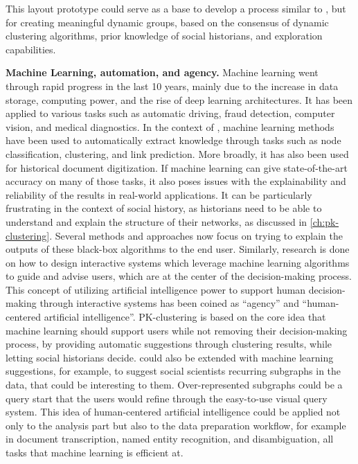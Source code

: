 This layout prototype could serve as a base to develop a process similar to \pkclustering, but for creating meaningful dynamic groups, based on the consensus of dynamic clustering algorithms, prior knowledge of social historians, and exploration capabilities.



\noindent\textbf{Machine Learning, automation, and agency.} Machine learning went through rapid progress in the last 10 years, mainly due to the increase in data storage, computing power, and the rise of deep learning architectures.
It has been applied to various tasks such as automatic driving, fraud detection, computer vision, and medical diagnostics.
In the context of \sna, machine learning methods have been used to automatically extract knowledge through tasks such as node classification, clustering, and link prediction\cite{michalskiPredictingSocialNetwork2012}.
More broadly, it has also been used for historical document digitization\cite{philipsHistoricalDocumentProcessing2020}.
If machine learning can give state-of-the-art accuracy on many of those tasks, it also poses issues with the explainability and reliability of the results in real-world applications.
It can be particularly frustrating in the context of social history, as historians need to be able to understand and explain the structure of their networks, as discussed in \autoref{ch:pk-clustering}.
Several methods and approaches now focus on trying to explain the outputs of these black-box algorithms to the end user\cite{holzingerMachineLearningExplainable2018}.
Similarly, research is done on how to design interactive systems which leverage machine learning algorithms to guide and advise users, which are at the center of the decision-making process.
This concept of utilizing artificial intelligence power to support human decision-making through interactive systems has been coined as ``agency''\cite{heerAgencyAutomationDesigning2019} and ``human-centered artificial intelligence''\cite{shneidermanHumanCenteredAI2022}.
PK-clustering is based on the core idea that machine learning should support users while not removing their decision-making process, by providing automatic suggestions through clustering results, while letting social historians decide.
\name could also be extended with machine learning suggestions, for example, to suggest social scientists recurring subgraphs in the data, that could be interesting to them.
Over-represented subgraphs could be a query start that the users would refine through the easy-to-use visual query system.
This idea of human-centered artificial intelligence could be applied not only to the analysis part but also to the data preparation workflow, for example in document transcription, named entity recognition, and disambiguation, all tasks that machine learning is efficient at.

